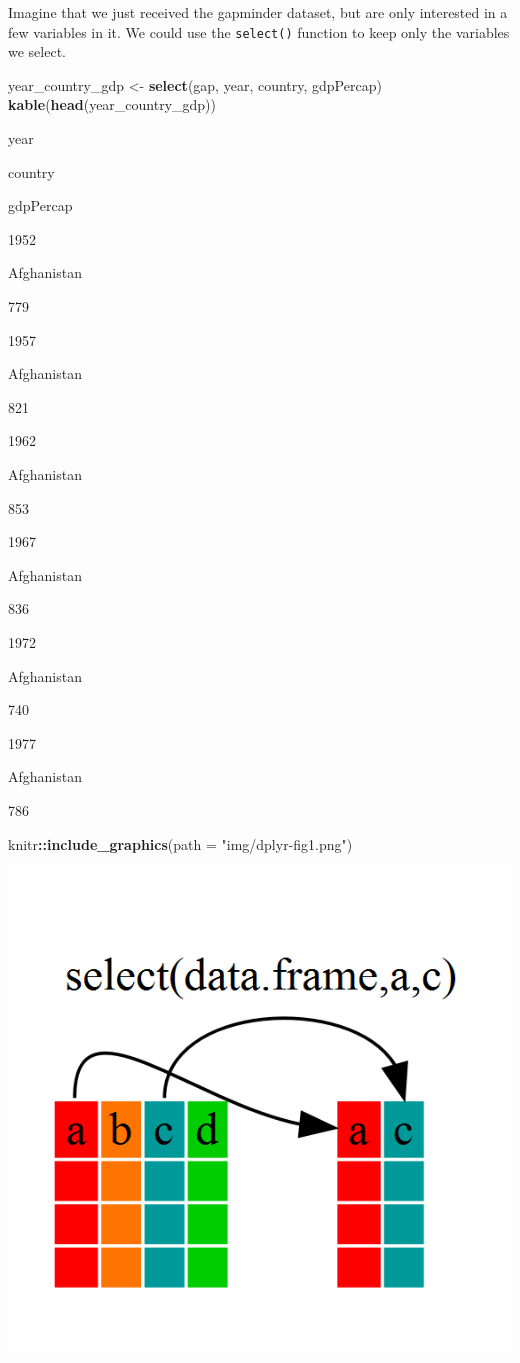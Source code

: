 \documentclass[]{book}
\newenvironment{Shaded}{\begin{snugshade}}{\end{snugshade}}
\newcommand{\KeywordTok}[1]{\textcolor[rgb]{0.13,0.29,0.53}{\textbf{#1}}}
\newcommand{\DataTypeTok}[1]{\textcolor[rgb]{0.13,0.29,0.53}{#1}}
\newcommand{\StringTok}[1]{\textcolor[rgb]{0.31,0.60,0.02}{#1}}
\newcommand{\OperatorTok}[1]{\textcolor[rgb]{0.81,0.36,0.00}{\textbf{#1}}}
\newcommand{\NormalTok}[1]{#1}
\begin{document}
Imagine that we just received the gapminder dataset, but are only
interested in a few variables in it. We could use the \texttt{select()}
function to keep only the variables we select.

\begin{Shaded}
\begin{Highlighting}[]
\NormalTok{year_country_gdp <-}\StringTok{ }\KeywordTok{select}\NormalTok{(gap, year, country, gdpPercap)}
\KeywordTok{kable}\NormalTok{(}\KeywordTok{head}\NormalTok{(year_country_gdp))}
\end{Highlighting}
\end{Shaded}

year

country

gdpPercap

1952

Afghanistan

779

1957

Afghanistan

821

1962

Afghanistan

853

1967

Afghanistan

836

1972

Afghanistan

740

1977

Afghanistan

786

\begin{Shaded}
\begin{Highlighting}[]
\NormalTok{knitr}\OperatorTok{::}\KeywordTok{include_graphics}\NormalTok{(}\DataTypeTok{path =} \StringTok{"img/dplyr-fig1.png"}\NormalTok{)}
\end{Highlighting}
\end{Shaded}

\begin{center}\includegraphics[width=0.7\linewidth]{img/dplyr-fig1} \end{center}
\end{document}
